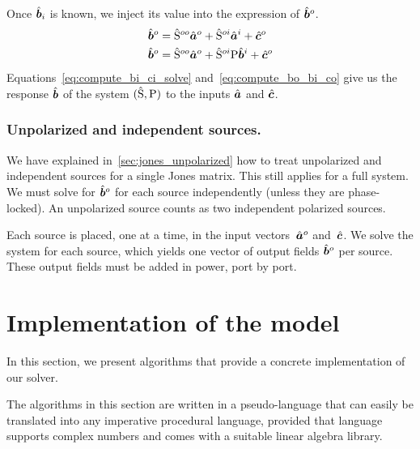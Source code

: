 Once $\hat{\bm{b}}_i$ is known, we inject its value into the expression of $\hat{\bm{b}}^o$.
\begin{subequations}
    \label{eq:compute_bo_co}
    \begin{align}
        \hat{\bm{b}}^o
        &=
        \hat{\mathrm{S}}^{oo} \hat{\bm{a}}^o +
        \hat{\mathrm{S}}^{oi} \hat{\bm{a}}^i +
        \hat{\bm{c}}^o
        \label{eq:compute_bo_ai_co}
        \\
        \hat{\bm{b}}^o
        &=
        \hat{\mathrm{S}}^{oo} \hat{\bm{a}}^o +
        \hat{\mathrm{S}}^{oi} \mathrm{P} \hat{\bm{b}}^i +
        \hat{\bm{c}}^o
        \label{eq:compute_bo_bi_co}
    \end{align}
\end{subequations}
Equations~\eqref{eq:compute_bi_ci_solve} and~\eqref{eq:compute_bo_bi_co} give us the response $\hat{\bm{b}}$ of the system $(\hat{\mathrm{S}}, \mathrm{P})$ to the inputs $\hat{\bm{a}}$ and $\hat{\bm{c}}$.




\subsubsection{Unpolarized and independent sources.}

We have explained in~\cref{sec:jones_unpolarized} how to treat unpolarized and independent sources for a single Jones matrix.
This still applies for a full system.
We must solve for $\hat{\bm{b}}^o$ for each source independently (unless they are phase-locked).
An unpolarized source counts as two independent polarized sources.

Each source is placed, one at a time, in the input vectors~$\hat{\bm{a}}^o$ and~$\hat{\bm{c}}$.
We solve the system for each source, which yields one vector of output fields $\hat{\bm{b}}^o$ per source.
These output fields must be added in power, port by port.



\FloatBarrier
\section{Implementation of the model}
\label{sec:solver_implementation}
In this section, we present algorithms that provide a concrete implementation of our solver.

The algorithms in this section are written in a pseudo-language that can easily be translated into any imperative procedural language, provided that language supports complex numbers and comes with a suitable linear algebra library.

